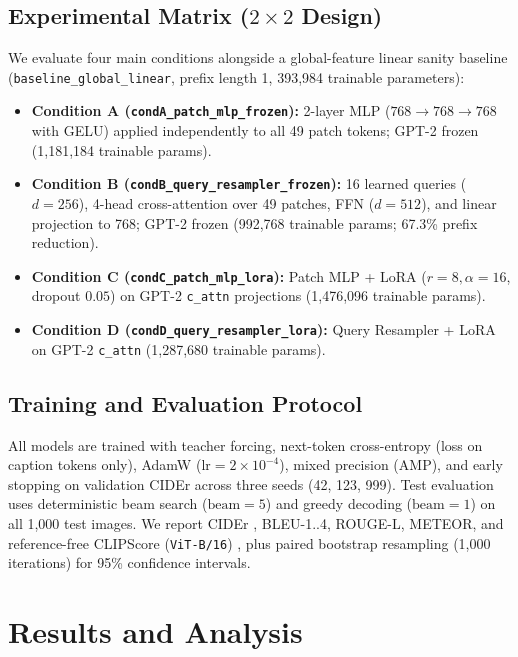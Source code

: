 \documentclass[conference]{IEEEtran}
\begin{document}
\subsection{Experimental Matrix ($2 \times 2$ Design)}
We evaluate four main conditions alongside a global-feature linear sanity baseline (\texttt{baseline\_global\_linear}, prefix length 1, 393,984 trainable parameters):
\begin{itemize}
    \item \textbf{Condition A (\texttt{condA\_patch\_mlp\_frozen}):} 2-layer MLP ($768 \rightarrow 768 \rightarrow 768$ with GELU) applied independently to all 49 patch tokens; GPT-2 frozen (1,181,184 trainable params).
    \item \textbf{Condition B (\texttt{condB\_query\_resampler\_frozen}):} 16 learned queries ($d=256$), 4-head cross-attention over 49 patches, FFN ($d=512$), and linear projection to 768; GPT-2 frozen (992,768 trainable params; 67.3\% prefix reduction).
    \item \textbf{Condition C (\texttt{condC\_patch\_mlp\_lora}):} Patch MLP + LoRA ($r=8, \alpha=16$, dropout $0.05$) on GPT-2 \texttt{c\_attn} projections (1,476,096 trainable params).
    \item \textbf{Condition D (\texttt{condD\_query\_resampler\_lora}):} Query Resampler + LoRA on GPT-2 \texttt{c\_attn} (1,287,680 trainable params).
\end{itemize}

\subsection{Training and Evaluation Protocol}
All models are trained with teacher forcing, next-token cross-entropy (loss on caption tokens only), AdamW ($\text{lr}=2\times 10^{-4}$), mixed precision (AMP), and early stopping on validation CIDEr across three seeds (42, 123, 999). Test evaluation uses deterministic beam search ($\text{beam}=5$) and greedy decoding ($\text{beam}=1$) on all 1,000 test images. We report CIDEr \cite{vedantam2015cider}, BLEU-1..4, ROUGE-L, METEOR, and reference-free CLIPScore (\texttt{ViT-B/16}) \cite{hessel2021clipscore}, plus paired bootstrap resampling (1,000 iterations) for 95\% confidence intervals.

\section{Results and Analysis}
\end{document}
